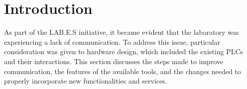 \chapter{Introduction}
As part of the LAB.E.S initiative, it became evident that the laboratory was experiencing a lack of communication. To address this issue, particular consideration was given to hardware design, which included the existing PLCs and their interactions. This section discusses the steps made to improve communication, the features of the available tools, and the changes needed to properly incorporate new functionalities and services.
\clearpage



